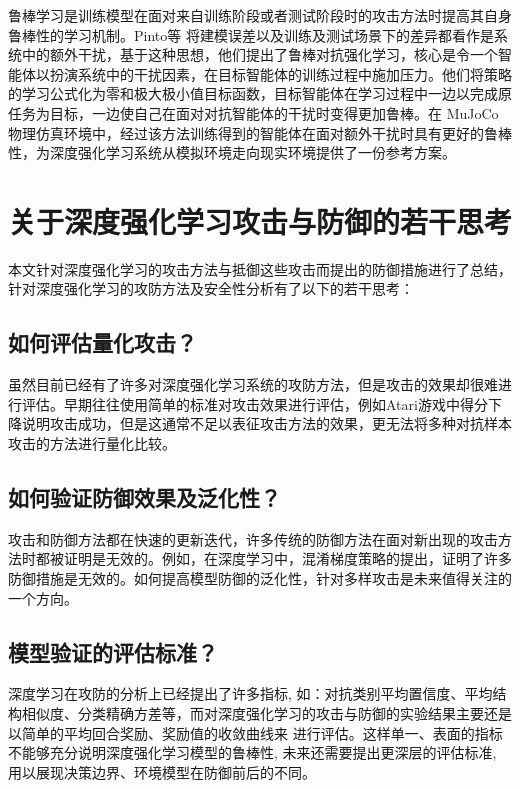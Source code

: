 \documentclass[lettersize,journal]{IEEEtran}
\begin{document}
\quad 鲁棒学习是训练模型在面对来自训练阶段或者测试阶段时的攻击方法时提高其自身鲁棒性的学习机制。Pinto等\cite{pinto2017robust} 将建模误差以及训练及测试场景下的差异都看作是系统中的额外干扰，基于这种思想，他们提出了鲁棒对抗强化学习，核心是令一个智能体以扮演系统中的干扰因素，在目标智能体的训练过程中施加压力。他们将策略的学习公式化为零和极大极小值目标函数，目标智能体在学习过程中一边以完成原任务为目标，一边使自己在面对对抗智能体的干扰时变得更加鲁棒。在 MuJoCo 物理仿真环境中，经过该方法训练得到的智能体在面对额外干扰时具有更好的鲁棒性，为深度强化学习系统从模拟环境走向现实环境提供了一份参考方案。





\section{关于深度强化学习攻击与防御的若干思考}

本文针对深度强化学习的攻击方法与抵御这些攻击而提出的防御措施进行了总结，针对深度强化学习的攻防方法及安全性分析有了以下的若干思考：

\subsection{如何评估量化攻击？}
虽然目前已经有了许多对深度强化学习系统的攻防方法，但是攻击的效果却很难进行评估。早期往往使用简单的标准对攻击效果进行评估，例如Atari游戏中得分下降说明攻击成功，但是这通常不足以表征攻击方法的效果，更无法将多种对抗样本攻击的方法进行量化比较。

\subsection{如何验证防御效果及泛化性？}
\quad 攻击和防御方法都在快速的更新迭代，许多传统的防御方法在面对新出现的攻击方法时都被证明是无效的。例如，在深度学习中，混淆梯度策略的提出，证明了许多防御措施是无效的。如何提高模型防御的泛化性，针对多样攻击是未来值得关注的一个方向。


\subsection{模型验证的评估标准？}
深度学习在攻防的分析上已经提出了许多指标, 如：对抗类别平均置信度、平均结构相似度、分类精确方差等，而对深度强化学习的攻击与防御的实验结果主要还是以简单的平均回合奖励、奖励值的收敛曲线来 进行评估。这样单一、表面的指标不能够充分说明深度强化学习模型的鲁棒性, 未来还需要提出更深层的评估标准, 用以展现决策边界、环境模型在防御前后的不同。
\end{document}
